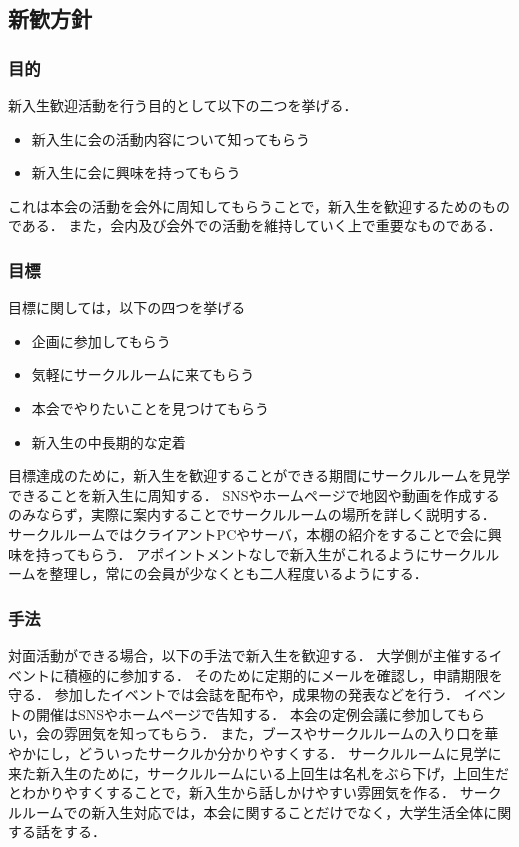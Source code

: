\subsection*{新歓方針}


\subsubsection*{目的}
新入生歓迎活動を行う目的として以下の二つを挙げる．
\begin{itemize}
\item 新入生に会の活動内容について知ってもらう
\item 新入生に会に興味を持ってもらう
\end{itemize}
これは本会の活動を会外に周知してもらうことで，新入生を歓迎するためのものである．
また，会内及び会外での活動を維持していく上で重要なものである．

\subsubsection*{目標}
目標に関しては，以下の四つを挙げる
\begin{itemize}
\item 企画に参加してもらう
\item 気軽にサークルルームに来てもらう
\item 本会でやりたいことを見つけてもらう
\item 新入生の中長期的な定着
\end{itemize}
目標達成のために，新入生を歓迎することができる期間にサークルルームを見学できることを新入生に周知する．
SNSやホームページで地図や動画を作成するのみならず，実際に案内することでサークルルームの場所を詳しく説明する．
サークルルームではクライアントPCやサーバ，本棚の紹介をすることで会に興味を持ってもらう．
アポイントメントなしで新入生がこれるようにサークルルームを整理し，常に\secondGrade{}の会員が少なくとも二人程度いるようにする．

\subsubsection*{手法}
対面活動ができる場合，以下の手法で新入生を歓迎する．
大学側が主催するイベントに積極的に参加する．
そのために定期的にメールを確認し，申請期限を守る．
参加したイベントでは会誌を配布や，成果物の発表などを行う．
イベントの開催はSNSやホームページで告知する．
本会の定例会議に参加してもらい，会の雰囲気を知ってもらう．
また，ブースやサークルルームの入り口を華やかにし，どういったサークルか分かりやすくする．
サークルルームに見学に来た新入生のために，サークルルームにいる上回生は名札をぶら下げ，上回生だとわかりやすくすることで，新入生から話しかけやすい雰囲気を作る．
サークルルームでの新入生対応では，本会に関することだけでなく，大学生活全体に関する話をする．
